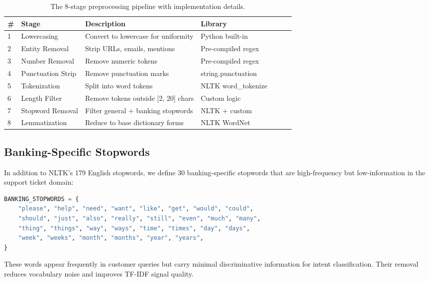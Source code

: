 \documentclass[12pt,a4paper]{article}
\renewcommand{\arraystretch}{1.5}
\newcommand{\goldrowcolors}{%
    \rowcolors{2}{bgCard}{bgDark}%
}
\newcommand{\tableheader}[1]{\textcolor{accentGold}{\textbf{#1}}}
\newcommand{\tablehdrrow}{\rowcolor{accentCard}}
\begin{document}
\begin{table}[H]
\centering
\goldrowcolors
\renewcommand{\arraystretch}{1.5}
\begin{tabular}{@{}C{0.8cm} V L{3.5cm} V L{7cm} V L{3cm}@{}}
\toprule
\tablehdrrow
\tableheader{\#} & \tableheader{Stage} & \tableheader{Description} & \tableheader{Library} \\
 & Lowercasing & Convert to lowercase for uniformity & Python built-in \\
2 & Entity Removal & Strip URLs, emails, mentions & Pre-compiled regex \\
3 & Number Removal & Remove numeric tokens & Pre-compiled regex \\
4 & Punctuation Strip & Remove punctuation marks & string.punctuation \\
5 & Tokenization & Split into word tokens & NLTK word\_tokenize \\
6 & Length Filter & Remove tokens outside [2, 20] chars & Custom logic \\
7 & Stopword Removal & Filter general + banking stopwords & NLTK + custom \\
8 & Lemmatization & Reduce to base dictionary forms & NLTK WordNet \\
\bottomrule
\end{tabular}
\caption{The 8-stage preprocessing pipeline with implementation details.}
\label{tab:pipeline-stages}
\end{table}

\subsection{Banking-Specific Stopwords}
\label{subsec:banking-stopwords}

In addition to NLTK's 179 English stopwords, we define 30 banking-specific stopwords that are high-frequency but low-information in the support ticket domain:

\begin{lstlisting}[language=Python, caption={Banking-specific stopwords from \texttt{preprocessing.py}}]
BANKING_STOPWORDS = {
    "please", "help", "need", "want", "like", "get", "would", "could",
    "should", "just", "also", "really", "still", "even", "much", "many",
    "thing", "things", "way", "ways", "time", "times", "day", "days",
    "week", "weeks", "month", "months", "year", "years",
}
\end{lstlisting}

These words appear frequently in customer queries but carry minimal discriminative information for intent classification. Their removal reduces vocabulary noise and improves TF-IDF signal quality.
\end{document}
